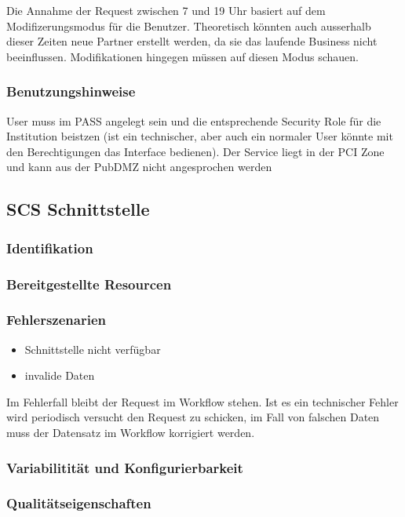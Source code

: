 Die Annahme der Request zwischen 7 und 19 Uhr basiert auf dem Modifizerungsmodus für die Benutzer. Theoretisch könnten auch ausserhalb dieser Zeiten neue Partner erstellt werden, da sie das laufende Business nicht beeinflussen. Modifikationen hingegen müssen auf diesen Modus schauen.

\subsubsection{Benutzungshinweise} 

User muss im PASS angelegt sein und die entsprechende Security Role für die Institution beistzen (ist ein technischer, aber auch ein normaler User könnte mit den Berechtigungen das Interface bedienen).
Der Service liegt in der PCI Zone und kann aus der PubDMZ nicht angesprochen werden
	
\subsection{SCS Schnittstelle}

\subsubsection{Identifikation}

\subsubsection{Bereitgestellte Resourcen}

\subsubsection{Fehlerszenarien}

\begin{itemize}
	\item Schnittstelle nicht verfügbar
	\item invalide Daten
\end{itemize}
Im Fehlerfall bleibt der Request im Workflow stehen. Ist es ein technischer Fehler wird periodisch versucht den Request zu schicken, im Fall von falschen Daten muss der Datensatz im Workflow korrigiert werden.

\subsubsection{Variabilitität und Konfigurierbarkeit}

\subsubsection{Qualitätseigenschaften}

